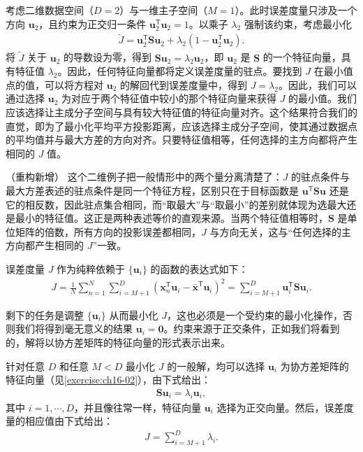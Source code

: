 \documentclass[../../main.tex]{subfiles}
\begin{document}
\begin{example}[ 二维数据的一维主子空间]\label{example:ch16-二维主成分}
考虑二维数据空间（$D=2$）与一维主子空间（$M=1$）。此时误差度量只涉及一个方向 $\bm{u}_2$，且约束为正交归一条件 $\bm{u}_2^{\mathsf T}\bm{u}_2=1$。以乘子 $\lambda_2$ 强制该约束，考虑最小化
\begin{align}
  \tilde{J}=\bm{u}_2^{\mathsf T}\bm{S}\bm{u}_2+\lambda_2\left(1-\bm{u}_2^{\mathsf T}\bm{u}_2\right).
  \label{align:ch16-误差Lagrange}
\end{align}
将 $\tilde{J}$ 关于 $\bm{u}_2$ 的导数设为零，得到 $\bm{S}\bm{u}_2=\lambda_2\bm{u}_2$，即 $\bm{u}_2$ 是 $\bm{S}$ 的一个特征向量，具有特征值 $\lambda_2$。因此，任何特征向量都将定义误差度量的驻点。要找到 $J$ 在最小值点的值，可以将方程对 $\bm{u}_2$ 的解回代到误差度量中，得到 $J=\lambda_2$。因此，我们可以通过选择 $\bm{u}_2$ 为对应于两个特征值中较小的那个特征向量来获得 $J$ 的最小值。我们应该选择让主成分子空间与具有较大特征值的特征向量对齐。这个结果符合我们的直觉，即为了最小化平均平方投影距离，应该选择主成分子空间，使其通过数据点的平均值并与最大方差的方向对齐。只要特征值相等，任何选择的主方向都将产生相同的 $J$ 值。
\end{example}

\begin{remark}（重构新增）
这个二维例子把一般情形中的两个量分离清楚了：$J$ 的驻点条件与最大方差表述的驻点条件是同一个特征方程，区别只在于目标函数是 $\bm{u}^{\mathsf T}\bm{S}\bm{u}$ 还是它的相反数，因此驻点集合相同，而“取最大”与“取最小”的差别就体现为选最大还是最小的特征值。这正是两种表述等价的直观来源。当两个特征值相等时，$\bm{S}$ 是单位矩阵的倍数，所有方向的投影误差都相同，$J$ 与方向无关，这与“任何选择的主方向都产生相同的 $J$”一致。
\end{remark}

误差度量 $J$ 作为纯粹依赖于 $\{\bm{u}_i\}$ 的函数的表达式如下：
\begin{align}
  J=\frac{1}{N}\sum_{n=1}^{N}\sum_{i=M+1}^{D}\left(\bm{x}_n^{\mathsf T}\bm{u}_i-\bar{\bm{x}}^{\mathsf T}\bm{u}_i\right)^2=\sum_{i=M+1}^{D}\bm{u}_i^{\mathsf T}\bm{S}\bm{u}_i.
  \label{align:ch16-误差函数}
\end{align}

剩下的任务是调整 $\{\bm{u}_i\}$ 从而最小化 $J$，这也必须是一个受约束的最小化操作，否则我们将得到毫无意义的结果 $\bm{u}_i=\bm{0}$。约束来源于正交条件，正如我们将看到的，解将以协方差矩阵的特征向量的形式表示出来。

针对任意 $D$ 和任意 $M<D$ 最小化 $J$ 的一般解，均可以选择 $\bm{u}_i$ 为协方差矩阵的特征向量（见\cref{exercise:ch16-02}），由下式给出：
\begin{align}
  \bm{S}\bm{u}_i=\lambda_i\bm{u}_i,
  \label{align:ch16-特征方程全}
\end{align}
其中 $i=1,\cdots,D$，并且像往常一样，特征向量 $\bm{u}_i$ 选择为正交向量。然后，误差度量的相应值由下式给出：
\begin{align}
  J=\sum_{i=M+1}^{D}\lambda_i.
  \label{align:ch16-误差最小值}
\end{align}
\end{document}
